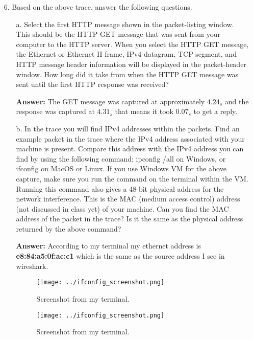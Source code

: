 \documentclass[12pt,letterpaper]{article}
\begin{document}
\begin{enumerate}
    \item[6.] Based on the above trace, answer the following questions.
    \begin{enumerate}
        \item[a.] Select the first HTTP message shown in the packet-listing window. This should be the HTTP GET
message that was sent from your computer to the HTTP server. When you select the HTTP GET
message, the Ethernet or Ethernet II frame, IPv4 datagram, TCP segment, and HTTP message
header information will be displayed in the packet-header window. How long did it take from
when the HTTP GET message was sent until the first HTTP response was received?

        {\bf Answer:} The GET message was captured at approximately $4.24_s$ and the response was captured at $4.31_s$ that means it took $0.07_s$ to get a reply.

       \item[b.] In the trace you will find IPv4 addresses within the packets. Find an example packet in the trace
where the IPv4 address associated with your machine is present. Compare this address with the
IPv4 address you can find by using the following command: ipconfig /all on Windows, or ifconfig on
MacOS or Linux. If you use Windows VM for the above capture, make sure you run the command
on the terminal within the VM. Running this command also gives a 48-bit physical address for the
network interference. This is the MAC (medium access control) address (not discussed in class yet)
of your machine. Can you find the MAC address of the packet in the trace? Is it the same as the
physical address returned by the above command?

         {\bf Answer:} According to my terminal my ethernet address is {\bf e8:84:a5:0f:ac:c1} which is the same as the source address I see in wireshark.

        \begin{figure}
             \centering
             \texttt{[image: ../ifconfig\_screenshot.png]}
             \caption{Screenshot from my terminal.}
             \label{fig:1}
        \end{figure}

        \begin{figure}
             \centering
             \texttt{[image: ../ifconfig\_screenshot.png]}
             \caption{Screenshot from my terminal.}
             \label{fig:1}
        \end{figure}

    \end{enumerate}
\end{enumerate}

\end{document}
